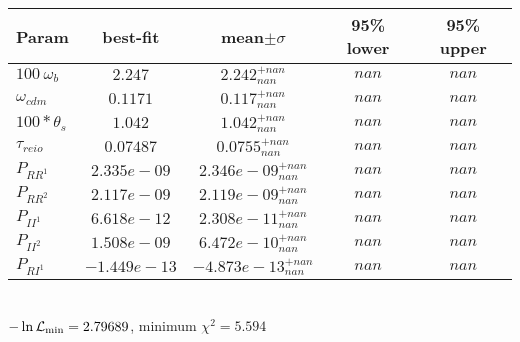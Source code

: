 \begin{tabular}{|l|c|c|c|c|} 
 \hline 
Param & best-fit & mean$\pm\sigma$ & 95\% lower & 95\% upper \\ \hline 
$100~\omega_{b }$ &$2.247$ & $2.242_{nan}^{+nan}$ & $nan$ & $nan$ \\ 
$\omega_{cdm }$ &$0.1171$ & $0.117_{nan}^{+nan}$ & $nan$ & $nan$ \\ 
$100*\theta_{s }$ &$1.042$ & $1.042_{nan}^{+nan}$ & $nan$ & $nan$ \\ 
$\tau_{reio }$ &$0.07487$ & $0.0755_{nan}^{+nan}$ & $nan$ & $nan$ \\ 
$P_{{RR}^1 }$ &$2.335e-09$ & $2.346e-09_{nan}^{+nan}$ & $nan$ & $nan$ \\ 
$P_{{RR}^2 }$ &$2.117e-09$ & $2.119e-09_{nan}^{+nan}$ & $nan$ & $nan$ \\ 
$P_{{II}^1 }$ &$6.618e-12$ & $2.308e-11_{nan}^{+nan}$ & $nan$ & $nan$ \\ 
$P_{{II}^2 }$ &$1.508e-09$ & $6.472e-10_{nan}^{+nan}$ & $nan$ & $nan$ \\ 
$P_{{RI}^1 }$ &$-1.449e-13$ & $-4.873e-13_{nan}^{+nan}$ & $nan$ & $nan$ \\ 
\hline 
 \end{tabular} \\ 
$-\ln{\cal L}_\mathrm{min} =2.79689$, minimum $\chi^2=5.594$ \\ 
